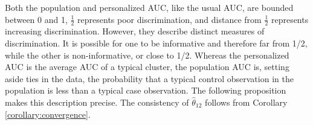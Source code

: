 \documentclass[12pt]{article}
\DeclareMathOperator{\AUC}{AUC}
\newcommand{\I}{I}
\renewcommand{\P}{P}
\newcommand{\cind}{\perp \!\!\! \perp}
\newcommand{\aucpop}{\theta_{12}}%
\newcommand{\aucpophat}{\hat{\theta}_{12}}%
\begin{document}
Both the population and personalized AUC, like the usual AUC, are bounded
between 0 and 1, $\frac{1}{2}$ represents poor discrimination, and
distance from $\frac{1}{2}$ represents increasing
discrimination. However, they describe distinct measures of
discrimination. It is possible for one to be informative and therefore
far from 1/2, while the other is non-informative, or close to 1/2.
Whereas the personalized AUC is the average AUC of a typical cluster, the
population AUC is, setting aside ties in the data,
the probability that a typical control observation in the population
is less than a typical case observation. The following proposition makes this description precise. The consistency of $\aucpophat$ follows from Corollary \ref{corollary:convergence}.

\end{document}
